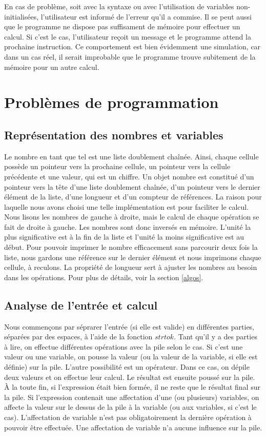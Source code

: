 \documentclass[letterpaper,12pt]{scrartcl}
\begin{document}
		En cas de problème, soit avec la syntaxe ou avec l'utilisation de variables non-initialisées, l'utilisateur est informé de l'erreur qu'il a commise. Il se peut aussi que le programme ne dispose pas suffisament de mémoire pour effectuer un calcul. Si c'est le cas, l'utilisateur reçoit un message et le programme attend la prochaine instruction. Ce comportement est bien évidemment une simulation, car dans un cas réel, il serait improbable que le programme trouve subitement de la mémoire pour un autre calcul. 
			
	
    
	\section{Problèmes de programmation}
		\subsection{Représentation des nombres et variables}
		Le nombre en tant que tel est une liste doublement chaînée. Ainsi, chaque cellule possède un pointeur vers la prochaine cellule, un pointeur vers la cellule précédente et une valeur, qui est un chiffre. Un objet nombre est constitué d'un pointeur vers la tête d'une liste doublement chaînée, d'un pointeur vers le dernier élément de la liste, d'une longueur et d'un compteur de références. La raison pour laquelle nous avons choisi une telle implémentation est pour faciliter le calcul. Nous lisons les nombres de gauche à droite, mais le calcul de chaque opération se fait de droite à gauche. Les nombres sont donc inversés en mémoire. L'unité la plus significative est à la fin de la liste et l'unité la moins significative est au début. Pour pouvoir imprimer le nombre efficacement sans parcourir deux fois la liste, nous gardons une référence sur le dernier élément et nous imprimons chaque cellule, à reculons. La propriété de longueur sert à ajuster les nombres au besoin dans les opérations. Pour plus de détails, voir la section \ref{algos}.

        
        \subsection{Analyse de l'entrée et calcul}
        Nous commençons par séprarer l'entrée (si elle est valide) en différentes parties, séparées par des espaces, à l'aide de la fonction $strtok$. Tant qu'il y a des parties à lire, on effectue différentes opérations avec la pile selon le cas. Si c'est une valeur ou une variable, on pousse la valeur (ou la valeur de la variable, si elle est définie) sur la pile. L'autre possibilité est un opérateur. Dans ce cas, on dépile deux valeurs et on effectue leur calcul. Le résultat est ensuite poussé sur la pile. À la toute fin, si l'expression était bien formée, il ne reste que le résultat final sur la pile. Si l'expression contenait une affectation d'une (ou plusieurs) variables, on affecte la valeur sur le dessus de la pile à la variable (ou aux variables, si c'est le cas). L'affectation de variable n'est pas obligatoirement la dernière opération à pouvoir être effectuée. Une affectation de variable n'a aucune
        influence sur la pile.
\end{document}
